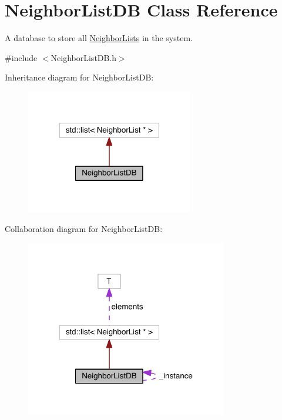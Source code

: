 \hypertarget{classNeighborListDB}{\section{Neighbor\+List\+D\+B Class Reference}
\label{classNeighborListDB}
}


A database to store all \hyperlink{classNeighborList}{Neighbor\+Lists} in the system.  




{\ttfamily \#include $<$Neighbor\+List\+D\+B.\+h$>$}



Inheritance diagram for Neighbor\+List\+D\+B\+:\nopagebreak
\begin{figure}[H]
\begin{center}
\leavevmode
\includegraphics[width=207pt]{classNeighborListDB__inherit__graph}
\end{center}
\end{figure}


Collaboration diagram for Neighbor\+List\+D\+B\+:\nopagebreak
\begin{figure}[H]
\begin{center}
\leavevmode
\includegraphics[width=250pt]{classNeighborListDB__coll__graph}
\end{center}
\end{figure}
